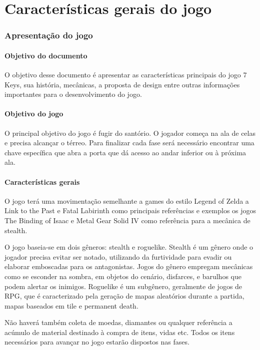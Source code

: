 \part*{Características gerais do jogo}
\section{Apresentação do jogo}
\subsection{Objetivo do documento}
O objetivo desse documento é apresentar as características principais do jogo 7 Keys, sua história, mecânicas, a proposta de design entre outras informações importantes para o desenvolvimento do jogo.

\subsection{Objetivo do jogo}     
O principal objetivo do jogo é fugir do santório. O jogador começa na ala de celas e precisa alcançar o térreo. Para finalizar cada fase será necessário encontrar uma chave específica que abra a porta que dá acesso ao andar inferior ou à próxima ala.

\subsection{Características gerais}

O jogo terá uma movimentação semelhante a games do estilo Legend of Zelda a Link to the Past e Fatal Labirinth como principais referências e exemplos os jogos The Binding of Isaac e Metal Gear Solid IV como referência para a mecânica de stealth.

 O jogo baseia-se em dois gêneros: stealth e roguelike. Stealth é um gênero onde o jogador precisa evitar ser notado, utilizando da furtividade para evadir ou elaborar emboscadas para os antagonistas. Jogos do gênero empregam mecânicas como se esconder na sombra, em objetos do cenário, disfarces, e barulhos que podem alertar os inimigos. Roguelike é um subgênero, geralmente de jogos de RPG, que é caracterizado pela geração de mapas aleatórios durante a partida, mapas baseados em tile e permanent death.

Não haverá também coleta de moedas, diamantes ou qualquer referência a acúmulo de material destinado à compra de itens, vidas etc. Todos os itens necessários para avançar no jogo estarão dispostos nas fases.

